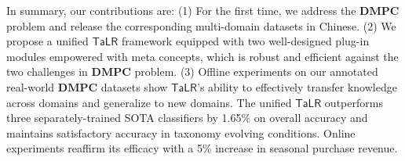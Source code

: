 In summary, our contributions are:
(1) For the first time, we address the $\mathbf{DMPC}$ problem and release 
the corresponding multi-domain datasets in Chinese. 
(2) We propose a unified $\mathsf{TaLR}$ framework equipped with two well-designed plug-in modules empowered with meta concepts, which is robust and efficient 
against the two challenges in $\mathbf{DMPC}$ problem.
(3) Offline experiments on our annotated real-world $\mathbf{DMPC}$ datasets show 
$\mathsf{TaLR}$'s ability to effectively transfer knowledge across domains 
and generalize to new domains. The unified $\mathsf{TaLR}$ outperforms three 
separately-trained SOTA classifiers by 1.65\% on overall accuracy and 
maintains satisfactory accuracy in taxonomy evolving conditions.
Online experiments reaffirm its efficacy with a 5\% increase in seasonal purchase revenue.
